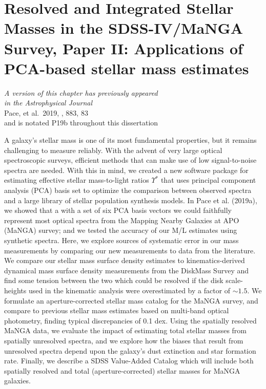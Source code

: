\chapter[Applications of PCA-based stellar mass estimates]{Resolved and Integrated Stellar Masses in the SDSS-IV/MaNGA Survey, Paper II: Applications of PCA-based stellar mass estimates}
\label{chapter2}

\vfill

\begin{flushright}
    \fixspacing %
    \textit{A version of this chapter has previously appeared\\
        in the \emph{Astrophysical Journal}} \\ \vspace{1ex}
    Pace, et al.\ 2019, \apj, 883, 83 \\ \vspace{1ex}
    and is notated P19b throughout this dissertation
\end{flushright}

\vspace*{1in} %

\cleardoublepage

\begin{chabstract}
A galaxy's stellar mass is one of its most fundamental properties, but it remains challenging to measure reliably. With the advent of very large optical spectroscopic surveys, efficient methods that can make use of low signal-to-noise spectra are needed. With this in mind, we created a new software package for estimating effective stellar mass-to-light ratios $\Upsilon^*$ that uses principal component analysis (PCA) basis set to optimize the comparison between observed spectra and a large library of stellar population synthesis models. In Pace et al. (2019a), we showed that a with a set of six PCA basis vectors we could faithfully represent most optical spectra from the Mapping Nearby Galaxies at APO (MaNGA) survey; and we tested the accuracy of our M/L estimates using synthetic spectra. Here, we explore sources of systematic error in our mass measurements by comparing our new measurements to data  from the literature. We compare our stellar mass surface density estimates to kinematics-derived dynamical mass surface density measurements from the DiskMass Survey and find some tension between the two which could be resolved if the disk scale-heights used in the kinematic analysis were overestimated by a factor of $\sim1.5$. We formulate an aperture-corrected stellar mass catalog for the MaNGA survey, and compare to previous stellar mass estimates based on multi-band optical photometry, finding typical discrepancies of 0.1 dex. Using the spatially resolved MaNGA data, we evaluate the impact of estimating total stellar masses from spatially unresolved spectra, and we explore how the biases that result from unresolved spectra depend upon the galaxy’s dust extinction and star formation rate. Finally, we describe a SDSS Value-Added Catalog which will include both spatially resolved and total (aperture-corrected) stellar masses for MaNGA galaxies.
\end{chabstract}
\cleardoublepage

